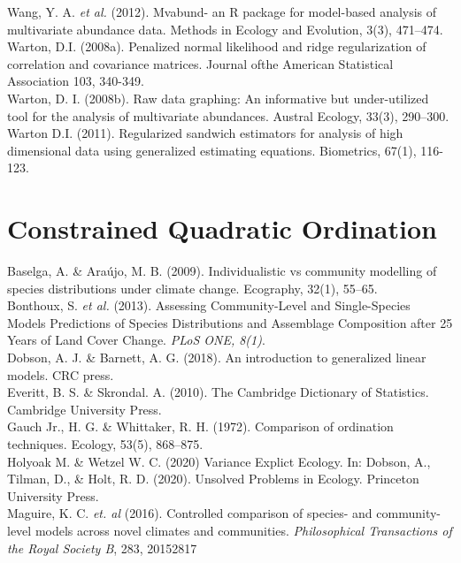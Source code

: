 \documentclass{article}
\begin{document}
Wang, Y. A. \textit{et al.} (2012). Mvabund- an R package for model-based analysis of multivariate abundance data. Methods in Ecology and Evolution, 3(3), 471–474. \\

Warton, D.I. (2008a). Penalized normal likelihood and ridge regularization of correlation and covariance matrices. Journal ofthe American Statistical Association 103, 340-349.\\ 

Warton, D. I. (2008b). Raw data graphing: An informative but under-utilized tool for the analysis of multivariate abundances. Austral Ecology, 33(3), 290–300.  \\

Warton D.I. (2011). Regularized sandwich estimators for analysis of high dimensional data using generalized estimating equations. Biometrics, 67(1), 116-123.\\

\section{Constrained Quadratic Ordination}

Baselga, A. \& Araújo, M. B. (2009). Individualistic vs community modelling of species distributions under climate change. Ecography, 32(1), 55–65. \\

Bonthoux, S. \textit{et al.} (2013). Assessing Community-Level and Single-Species Models Predictions of Species Distributions and Assemblage Composition after 25 Years of Land Cover Change. \textit{PLoS ONE, 8(1)}. \\

Dobson, A. J. \& Barnett, A. G. (2018). An introduction to generalized linear models. CRC press.\\

Everitt, B. S. \& Skrondal. A. (2010). The Cambridge Dictionary of Statistics. Cambridge University Press.\\

Gauch Jr., H. G. \& Whittaker, R. H. (1972). Comparison of ordination techniques. Ecology, 53(5), 868–875. \\

Holyoak M. \& Wetzel W. C. (2020) Variance Explict Ecology. In: Dobson, A., Tilman, D., \& Holt, R. D. (2020). Unsolved Problems in Ecology. Princeton University Press.\\

Maguire, K. C. \textit{et. al} (2016). Controlled comparison of species- and community-level models across novel climates and communities. \textit{Philosophical Transactions of the Royal Society B}, 283, 20152817\\
\end{document}

